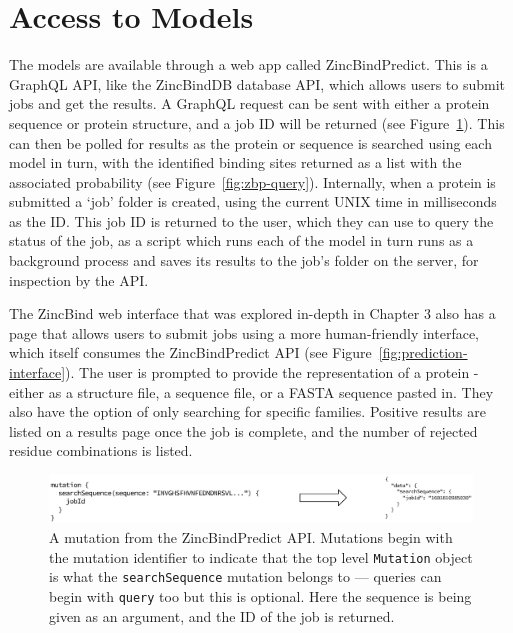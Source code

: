 \section{Access to Models}

The models are available through a web app called ZincBindPredict. This is a GraphQL API, like the ZincBindDB database API, which allows users to submit jobs and get the results. A GraphQL request can be sent with either a protein sequence or protein structure, and a job ID will be returned (see Figure~\ref{fig:zbp-mutation}). This can then be polled for results as the protein or sequence is searched using each model in turn, with the identified binding sites returned as a list with the associated probability (see Figure~\ref{fig:zbp-query}). Internally, when a protein is submitted a `job' folder is created, using the current UNIX time in milliseconds as the ID. This job ID is returned to the user, which they can use to query the status of the job, as a script which runs each of the model in turn runs as a background process and saves its results to the job's folder on the server, for inspection by the API.

The ZincBind web interface that was explored in-depth in Chapter 3 also has a page that allows users to submit jobs using a more human-friendly interface, which itself consumes the ZincBindPredict API (see Figure~\ref{fig:prediction-interface}). The user is prompted to provide the representation of a protein - either as a structure file, a sequence file, or a FASTA sequence pasted in. They also have the option of only searching for specific families. Positive results are listed on a results page once the job is complete, and the number of rejected residue combinations is listed.

\begin{figure}
\centering
\includegraphics[width=1.0\textwidth]{Figures/zbp-mutation.eps}
\caption[ZincBindPredict mutation request.]{\label{fig:zbp-mutation} A mutation from the ZincBindPredict API. Mutations
begin with the mutation identifier to indicate that the top level \texttt{Mutation} object
is what the \texttt{searchSequence} mutation belongs to --- queries can begin with
\texttt{query} too but this is optional. Here the sequence is being given as an
argument, and the ID of the job is returned.}
\end{figure}

